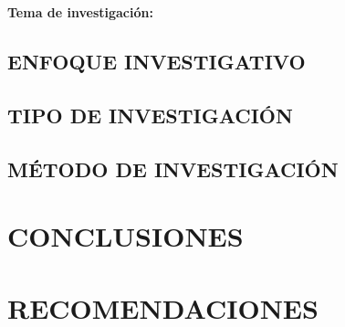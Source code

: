 \documentclass[12pt]{aunarAPA}
\begin{document}
\begin{RAE}
\textbf{Tema de investigación:}

\subsection*{ENFOQUE INVESTIGATIVO}

\subsection*{TIPO DE INVESTIGACIÓN}

\subsection*{MÉTODO DE INVESTIGACIÓN}

\section*{CONCLUSIONES}

\section*{RECOMENDACIONES}
% 

\end{RAE}
\end{document}
